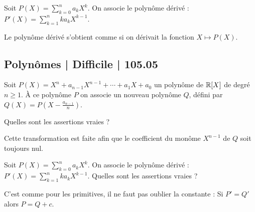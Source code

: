 \begin{question}
Soit $P(X) = \sum_{k=0}^n a_k X^k$. On associe le polynôme dérivé :
$P'(X) = \sum_{k=1}^n ka_k X^{k-1}$.
\begin{answers}



\end{answers}
\begin{explanations}
Le polynôme dérivé s'obtient comme si on dérivait la fonction $X \mapsto P(X)$. 
\end{explanations}
\end{question}


\subsection{Polynômes | Difficile | 105.05}


\begin{question}
Soit $P(X) = X^n + a_{n-1}X^{n-1} + \cdots + a_1X+a_0$ un polynôme de $\mathbb{R}[X]$ de degré $n \ge 1$. À ce polynôme $P$ on associe un nouveau polynôme $Q$, défini par $Q(X) = P(X - \frac{a_{n-1}}{n})$.

Quelles sont les assertions vraies ?
\begin{answers}



\end{answers}
\begin{explanations}
Cette transformation est faite afin que le coefficient du monôme $X^{n-1}$ de $Q$ soit toujours nul.
\end{explanations}
\end{question}


\begin{question}
Soit $P(X) = \sum_{k=0}^n a_k X^k$. On associe le polynôme dérivé :
$P'(X) = \sum_{k=1}^n ka_k X^{k-1}$. Quelles sont les assertions vraies ?
\begin{answers}



\end{answers}
\begin{explanations}
C'est comme pour les primitives, il ne faut pas oublier la constante :
Si $P'=Q'$ alors $P=Q +c$.
\end{explanations}
\end{question}



